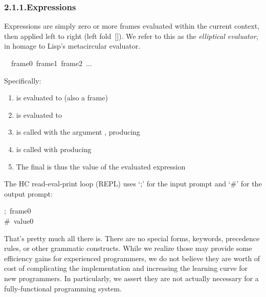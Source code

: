 \documentclass[preprint]{{sigplanconf}}
\begin{document}
\subsubsection{2.1.1.\hspace*{0.5em}Expressions}\label{sec-expressions}%

\noindent{}Expressions are simply zero or more frames evaluated within the current
context, then applied left to right (left fold~{}[]). We refer to
this as the \emph{elliptical evaluator}, in homage to Lisp's metacircular
evaluator.%
\begin{mdpre}%
\noindent~~frame0~frame1~frame2~{...}%
\end{mdpre}\noindent{}Specifically:

\begin{enumerate}[noitemsep,topsep=\mdcompacttopsep]%

\item{} is evaluated to  (also a frame)%

\item{} is evaluated to %

\item{} is called with the argument , producing %

\item{} is called with  producing %

\item{}The final  is thus the value of the evaluated expression%
\end{enumerate}%

\noindent{}The HC read-eval-print loop (REPL) uses \textquoteleft{};\textquoteright{} for the input prompt and \textquoteleft{}\#\textquoteright{} for the
output prompt:%
\begin{mdpre}%
\noindent;~frame0\\
{\#~value0}%
\end{mdpre}\noindent{}That's pretty much all there is. There are no special forms, keywords,
precedence rules, or other grammatic constructs. While we realize those
may provide some efficiency gains for experienced programmers, we do not
believe they are worth of cost of complicating the implementation and
increasing the learning curve for new programmers. In particularly,
we assert they are not actually necessary for a fully-functional programming system.
\end{document}
